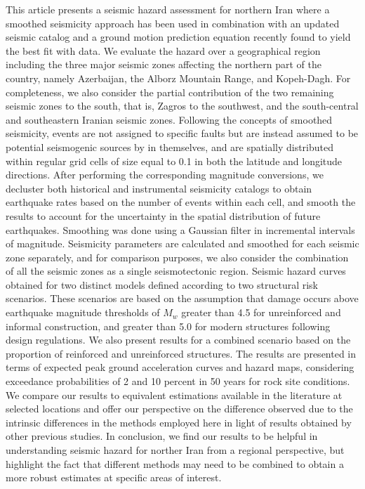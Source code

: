 % 
This article presents a seismic hazard assessment for northern Iran where a smoothed seismicity approach has been used in combination with an updated seismic catalog and a ground motion prediction equation recently found to yield the best fit with data. We evaluate the hazard over a geographical region including the three major seismic zones affecting the northern part of the country, namely Azerbaijan, the Alborz Mountain Range, and Kopeh-Dagh. For completeness, we also consider the partial contribution of the two remaining seismic zones to the south, that is, Zagros to the southwest, and the south-central and southeastern Iranian seismic zones. Following the concepts of smoothed seismicity, events are not assigned to specific faults but are instead assumed to be potential seismogenic sources by in themselves, and are spatially distributed within regular grid cells of size equal to 0.1\textdegree{} in both the latitude and longitude directions. After performing the corresponding magnitude conversions, we decluster both historical and instrumental seismicity catalogs to obtain earthquake rates based on the number of events within each cell, and smooth the results to account for the uncertainty in the spatial distribution of future earthquakes. Smoothing was done using a Gaussian filter in incremental intervals of magnitude. Seismicity parameters are calculated and smoothed for each seismic zone separately, and for comparison purposes, we also consider the combination of all the seismic zones as a single seismotectonic region. Seismic hazard curves obtained for two distinct models defined according to two structural risk scenarios. These scenarios are based on the assumption that damage occurs above earthquake magnitude thresholds of $M_w$ greater than 4.5 for unreinforced and informal construction, and greater than 5.0 for modern structures following design regulations. We also present results for a combined scenario based on the proportion of reinforced and unreinforced structures. The results are presented in terms of expected peak ground acceleration curves and hazard maps, considering exceedance probabilities of 2 and 10 percent in 50 years for rock site conditions. We compare our results to equivalent estimations available in the literature at selected locations and offer our perspective on the difference observed due to the intrinsic differences in the methods employed here in light of results obtained by other previous studies. In conclusion, we find our results to be helpful in understanding seismic hazard for norther Iran from a regional perspective, but highlight the fact that different methods may need to be combined to obtain a more robust estimates at specific areas of interest.


